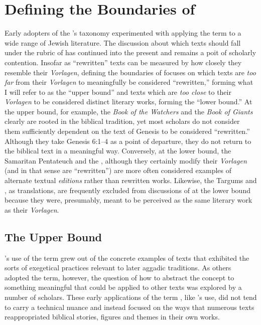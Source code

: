 
\section{Defining the Boundaries of \RWB}

Early adopters of the \vermes's taxonomy experimented with applying the term \rwb to a wide range of \secondtemple Jewish literature. The discussion about which texts should fall under the rubric of \rwb has continued into the present and remains a poit of scholarly contention. Insofar as ``rewritten'' texts can be measured by how closely they resemble their \emph{Vorlagen}, defining the boundaries of \rwb focuses on which texts are \emph{too far} from their \emph{Vorlagen} to meaningfully be considered ``rewritten,'' forming what I will refer to as the ``upper bound'' and texts which are \emph{too close} to their \emph{Vorlagen} to be considered distinct literary works, forming the ``lower bound.'' At the upper bound, for example, the \emph{Book of the Watchers} and the \emph{Book of Giants} clearly are rooted in the biblical tradition, yet most scholars do not consider them sufficiently dependent on the text of Genesis to be considered ``rewritten.'' Although they take Genesis 6:1--4 as a point of departure, they do not return to the biblical text in a meaningful way. Conversely, at the lower bound, the Samaritan Pentateuch and the , although they certainly modify their \emph{Vorlagen} (and in that sense are ``rewritten'') are more often considered examples of alternate textual \emph{editions} rather than rewritten works. Likewise, the Targums and \lxx, as translations, are frequently excluded from discussions of \rwb at the lower bound because they were, presumably, meant to be perceived as the same literary work as their \emph{Vorlagen}. 


\subsection{The Upper Bound}

\vermes's use of the term \rwb grew out of the concrete examples of texts that exhibited the sorts of exegetical practices relevant to later aggadic traditions. As others adopted the term, however, the question of how to abstract the concept to something meaningful that could be applied to other texts was explored by a number of scholars. These early applications of the term \rwb, like \vermes's use, did not tend to carry a technical nuance and instead focused on the ways that numerous texts reappropriated biblical stories, figures and themes in their own works. 


